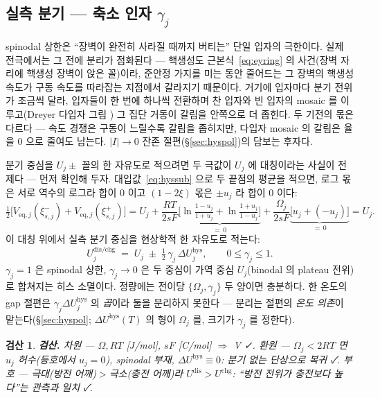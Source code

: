 \documentclass[11pt,a4paper]{article}
\newtheorem*{verifybox}{검산}
\newcommand{\eq}{\mathrm{eq}}
\newcommand{\dis}{\mathrm{dis}}
\newcommand{\chg}{\mathrm{chg}}
\newcommand{\hys}{\mathrm{hys}}
\begin{document}
\subsection{실측 분기 — 축소 인자 $\gamma_j$}
spinodal 상한은 ``장벽이 완전히 사라질 때까지 버티는'' 단일 입자의 극한이다. 실제 전극에서는 그 전에
분리가 점화된다 — 핵생성도 근본식~\eqref{eq:eyring} 의 사건(장벽 자리에 핵생성 장벽이 앉은 꼴)이라,
준안정 가지를 미는 동안 줄어드는 그 장벽의 핵생성 속도가 구동 속도를 따라잡는 지점에서 갈라지기 때문이다.
거기에 입자마다 분기 전위가 조금씩 달라, 입자들이 한 번에 하나씩 전환하며 찬 입자와 빈 입자의
mosaic 를 이루고(Dreyer 다입자 그림 \cite{dreyer2010}) 그 집단 거동이 갈림을 안쪽으로 더 좁힌다. 두 기전의 몫은 다르다 — 속도 경쟁은 구동이 느릴수록 갈림을 좁히지만, 다입자
mosaic 의 갈림은 율을 $0$ 으로 줄여도 남는다. $|I|\to0$ 잔존 절편(\S\ref{sec:hyspol})의 담보는
후자다.

분기 중심을 $U_j\pm$ 꼴의 한 자유도로 적으려면 두 극값이 $U_j$ 에 대칭이라는 사실이 전제다 — 먼저
확인해 두자. 대입값~\eqref{eq:hyssub} 으로 두 끝점의 평균을
적으면, 로그 몫은 서로 역수의 로그라 합이 $0$ 이고 $(1-2\xi)$ 몫은 $\pm u_j$ 라 합이 $0$ 이다:
\begin{equation}
\tfrac12\big[V_{\eq,j}(\xi_{s,j}^-)+V_{\eq,j}(\xi_{s,j}^+)\big]
=U_j+\frac{RT}{2sF}
\underbrace{\Big[\ln\tfrac{1-u_j}{1+u_j}+\ln\tfrac{1+u_j}{1-u_j}\Big]}_{=\,0}
+\frac{\Omega_j}{2sF}\underbrace{\big[u_j+(-u_j)\big]}_{=\,0}
=U_j.
\label{eq:hyssym}
\end{equation}
이 대칭 위에서 실측 분기 중심을 현상학적 한 자유도로 적는다:
\begin{equation}
U_j^{\dis/\chg}\;=\;U_j\;\pm\;\tfrac12\,\gamma_j\,\Delta U_j^\hys,
\qquad 0\le\gamma_j\le1.
\label{eq:hyscenter}
\end{equation}
$\gamma_j=1$ 은 spinodal 상한, $\gamma_j\to0$ 은 두 중심이 가역 중심 $U_j$(binodal 의 plateau 전위)로
합쳐지는 히스 소멸이다. 정량에는 전이당 $\{\Omega_j,\gamma_j\}$ 두 양이면 충분하다. 한 온도의 gap
절편은 $\gamma_j\Delta U_j^\hys$ 의 \emph{곱}이라 둘을 분리하지 못한다 — 분리는 절편의 \emph{온도
의존}이 맡는다(\S\ref{sec:hyspol}; $\Delta U^\hys(T)$ 의 형이 $\Omega_j$ 를, 크기가 $\gamma_j$ 를
정한다).

\begin{verifybox}
\textbf{검산.} 차원 — $\Omega,RT$ [J/mol], $sF$ [C/mol] $\Rightarrow$ V ✓. 환원 — $\Omega_j<2RT$ 면
$u_j$ 허수(등호에서 $u_j=0$), spinodal 부재, $\Delta U^\hys\equiv0$: 분기 없는 단상으로 복귀 ✓. 부호 — 극대(방전
어깨)$>$극소(충전 어깨)라 $U^{\dis}>U^{\chg}$: ``방전 전위가 충전보다 높다''는 관측과 일치 ✓.
\end{verifybox}
\end{document}
